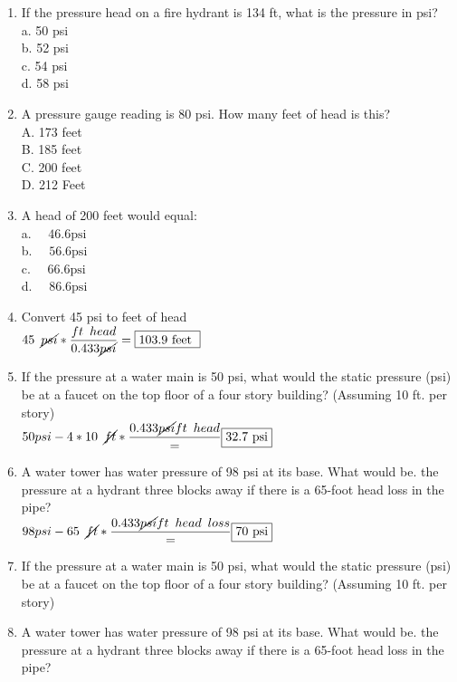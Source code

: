 \documentclass{article}
\begin{document}
\begin{enumerate}



\item If the pressure head on a fire hydrant is 134 ft, what is the pressure in psi?\\
a.	50 psi\\
b.	52 psi\\
c.	54 psi\\
d.	58 psi\\

\item A pressure gauge reading is 80 psi. How many feet of head is this?\\
A. 173 feet\\
B. 185 feet\\
C. 200 feet\\
D. 212 Feet\\

\item A head of 200 feet would equal:\\
a. $\quad 46.6 \mathrm{psi}$\\
b. $\quad 56.6 \mathrm{psi}$\\
c. $\quad 66.6 \mathrm{psi}$\\
d. $\quad 86.6 \mathrm{psi}$\\

\item Convert 45 psi to feet of head\\

 \vspace{0.4cm}
$
45 \enspace \cancel{psi}*\dfrac{ft \enspace head}{0.433\cancel{psi}}=\boxed{103.9 \text { feet }}
$
 

\item If the pressure at a water main is 50 psi, what would the static pressure (psi) be at a faucet on the top floor of a four story building? (Assuming 10 ft. per story)\\
 \vspace{0.4cm}
$
50 psi - 4*10 \enspace \cancel{ft}*\dfrac{0.433\cancel{psi}{ft \enspace head}}=\boxed{32.7 \text { psi}}
$
\item A water tower has water pressure of 98 psi at its base. What would be. the pressure at a hydrant three blocks away if there is a 65-foot head loss in the pipe?\\
 \vspace{0.4cm}
$
98 psi - 65 \enspace \cancel{ft}*\dfrac{0.433\cancel{psi}{ft \enspace head \enspace loss}}=\boxed{70 \text { psi}}
$
\item If the pressure at a water main is 50 psi, what would the static pressure (psi) be at a faucet on the top floor of a four story building? (Assuming 10 ft. per story)

\item A water tower has water pressure of 98 psi at its base. What would be. the pressure at a hydrant three blocks away if there is a 65-foot head loss in the pipe?\\

\end{enumerate}
\end{document}
